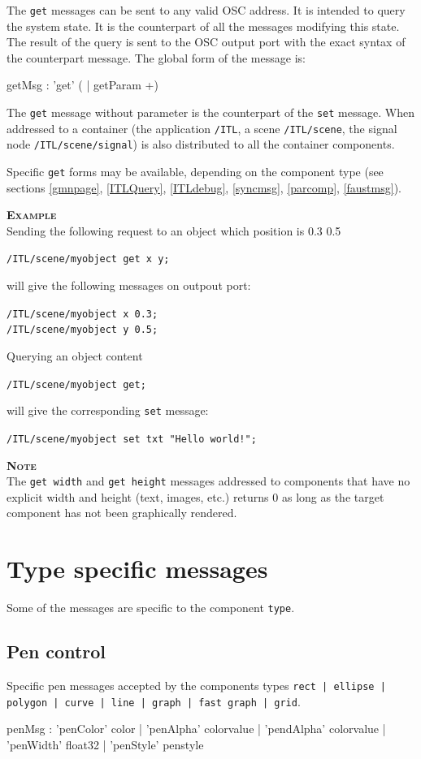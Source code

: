 \documentclass[a4paper,twoside]{report}
\newcommand{\toplevel}[1]	{\chapter{#1}}
\newcommand{\sublevel}[1]	{\section{#1}}
\newcommand{\OSC}[1]		{\texttt{#1}}
\newcommand{\example}		{\textbf{\hspace{-1.5cm}\textbf{\textsc{Example }}}}
\newcommand{\note}	[1]		{\vspace{2mm}\textbf{\hspace{-1.03cm}\textbf{\textsc{Note #1}}}}
\newcommand{\sample}	[1]			{\vspace{-2mm}\begin{center}\colorbox{mygrey}{
								\begin{minipage}[t]{0.9\columnwidth} 
								{\small \texttt{#1}}
								\end{minipage}}\end{center}}
\newcommand{\sampleindent}	{ \hspace{0.5cm} }
\begin{document}
The \OSC{get} messages can be sent to any valid OSC address. It is intended to query the system state. It is the counterpart of all the messages modifying this state.  The result of the query is sent to the OSC output port with the exact syntax of the counterpart message. 
The global form of the message is:
\begin{rail}
getMsg : 'get' ( | getParam +)
\end{rail}

The \OSC{get} message without parameter is the counterpart of the \OSC{set} message. When addressed to a container (the application \OSC{/ITL}, a scene \OSC{/ITL/scene}, the signal node \OSC{/ITL/scene/signal}) is also distributed to all the container components.

Specific \OSC{get} forms may be available, depending on the component type (see sections \ref{gmnpage},  \ref{ITLQuery}, \ref{ITLdebug}, \ref{syncmsg}, \ref{parcomp}, \ref{faustmsg}).

\example \\
Sending the following request to an object which position is 0.3 0.5
\sample{/ITL/scene/myobject get x y;}
\sampleindent will give the following messages on outpout port:
\sample{/ITL/scene/myobject x 0.3; \\
/ITL/scene/myobject y 0.5;}
Querying an object content
\sample{/ITL/scene/myobject get;}
\sampleindent will give the corresponding \OSC{set} message:
\sample{/ITL/scene/myobject set txt "Hello world!";}

\note{} \\
The \OSC{get width} and \OSC{get height} messages addressed to components that have no explicit width and height (text, images, etc.) returns 0 as long as the target component has not been graphically rendered.


\toplevel{Type specific messages}
\label{specificMsg}
Some of the messages are specific to the component \OSC{type}.


\sublevel{Pen control}

Specific pen messages accepted by the components types \OSC{rect | ellipse | polygon | curve | line | graph | fast graph | grid}.
\begin{rail}
penMsg : 	  'penColor' color 
			| 'penAlpha' colorvalue
			| 'pendAlpha' colorvalue
			| 'penWidth' float32
			| 'penStyle' penstyle
\end{rail}
\end{document}
